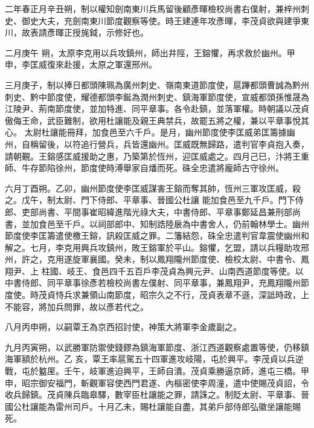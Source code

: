 \begin{pinyinscope}
 二年春正月辛丑朔，制以權知劍南東川兵馬留後顧彥暉檢校尚書右僕射，兼梓州刺史、御史大夫，充劍南東川節度觀察等使。時王建連年攻彥暉，李茂貞欲與建爭東川，故表請彥暉正授旄鉞，示修好也。



 二月庚午
 朔，太原李克用以兵攻鎮州，師出井陘，王鎔懼，再求救於幽州。甲申，李匡威復來赴援，太原之軍還邢州。



 三月庚子，制以捧日都頭陳珮為廣州刺史、嶺南東道節度使，扈蹕都頭曹誠為黔州刺史、黔中節度使，耀德都頭李鋋為潤州刺史、鎮海軍節度使，宣威都頭孫惟晟為江陵尹、荊南節度使，並加特進、同平章事。各令赴鎮，並落軍權。時朝議以茂貞傲侮王命，武臣難制，欲用杜讓能及親王典禁兵，故罷五將之權，兼以平章事悅其心。
 太尉杜讓能冊拜，加食邑至六千戶。是月，幽州節度使李匡威弟匡籌據幽州，自稱留後，以符追行營兵，兵皆還幽州。匡威既無歸路，遣判官李貞抱入奏，請朝覲。王鎔感匡威援助之惠，乃築第於恆州，迎匡威處之。四月己巳，汴將王重師、牛存節陷徐州，節度使時溥舉家自燔而死。硃全忠遣將龐師古守徐州。



 六月丁酉朔。乙卯，幽州節度使李匡威謀害王鎔而奪其帥，恆州三軍攻匡威，殺之。戊午，制太尉、門下侍郎、平章事、晉國公杜讓
 能加食邑至九千戶。門下侍郎、吏部尚書、平間事崔昭緯進階光祿大夫，中書侍郎、平章事鄭延昌兼刑部尚書，並加食邑至千戶。以祠部郎中、知制誥陸扆為中書舍人，仍前翰林學士。幽州節度使李匡籌遣使檄王鎔，訊殺匡威之罪。二籓結怨，硃全忠遣判官韋震使幽州和解之。七月，李克用興兵攻鎮州，敗王鎔軍於平山。鎔懼，乞盟，請以兵糧助攻邢州，許之，克用遂旋軍襄國。癸未，制以鳳翔隴州節度使、檢校太尉、中書令、鳳翔尹、上
 柱國、岐王、食邑四千五百戶李茂貞為興元尹、山南西道節度等使。以中書侍郎、同平章事徐彥若檢校尚書左僕射、同平章事，兼鳳翔尹，充鳳翔隴州節度使。時茂貞恃兵求兼領山南節度，昭宗久之不行，茂貞表章不遜，深詆時政，上不能容，將加兵問罪，故以彥若代之。



 八月丙申朔，以嗣覃王為京西招討使，神策大將軍李金歲副之。



 九月丙寅朔，以武勝軍防禦使錢鏐為鎮海軍節度、浙江西道觀察處置等使，仍移鎮海軍額於杭州。乙
 亥，覃王率扈駕五十四軍進攻岐陽，屯於興平。李茂貞以兵逆戰，屯於盭厔。壬午，岐軍進迫興平，王師自潰。茂貞乘勝逼京師，進屯三橋。甲申，昭宗御安福門，斬觀軍容使西門君遂、內樞密使李周潼，遣中使賜茂貞詔，令收兵歸鎮。茂貞陳兵臨皋驛，數宰臣杜讓能之罪，請誅之。制貶太尉、平章事、晉國公杜讓能為雷州司戶。十月乙未，賜杜讓能自盡，其弟戶部侍郎弘徽坐讓能賜死。




\end{pinyinscope}
